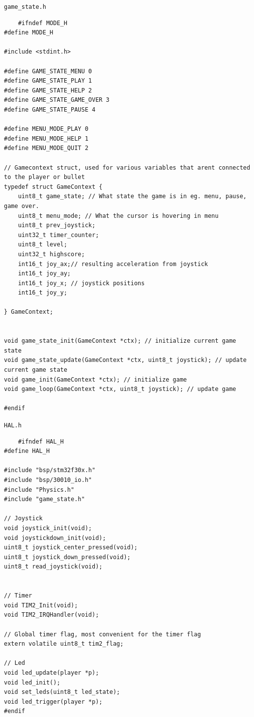 \texttt{game\_state.h}
\begin{lstlisting}
    #ifndef MODE_H
#define MODE_H

#include <stdint.h>

#define GAME_STATE_MENU 0
#define GAME_STATE_PLAY 1
#define GAME_STATE_HELP 2
#define GAME_STATE_GAME_OVER 3
#define GAME_STATE_PAUSE 4

#define MENU_MODE_PLAY 0
#define MENU_MODE_HELP 1
#define MENU_MODE_QUIT 2

// Gamecontext struct, used for various variables that arent connected to the player or bullet
typedef struct GameContext {
    uint8_t game_state; // What state the game is in eg. menu, pause, game over.
    uint8_t menu_mode; // What the cursor is hovering in menu
    uint8_t prev_joystick;
    uint32_t timer_counter;
    uint8_t level;
    uint32_t highscore;
    int16_t joy_ax;// resulting acceleration from joystick
    int16_t joy_ay;
    int16_t joy_x; // joystick positions
    int16_t joy_y;

} GameContext;


void game_state_init(GameContext *ctx); // initialize current game state
void game_state_update(GameContext *ctx, uint8_t joystick); // update current game state
void game_init(GameContext *ctx); // initialize game
void game_loop(GameContext *ctx, uint8_t joystick); // update game

#endif
\end{lstlisting}

\texttt{HAL.h}
\begin{lstlisting}
    #ifndef HAL_H
#define HAL_H

#include "bsp/stm32f30x.h"
#include "bsp/30010_io.h"
#include "Physics.h"
#include "game_state.h"

// Joystick
void joystick_init(void);
void joystickdown_init(void);
uint8_t joystick_center_pressed(void);
uint8_t joystick_down_pressed(void);
uint8_t read_joystick(void);


// Timer
void TIM2_Init(void);
void TIM2_IRQHandler(void);

// Global timer flag, most convenient for the timer flag
extern volatile uint8_t tim2_flag;

// Led
void led_update(player *p);
void led_init();
void set_leds(uint8_t led_state);
void led_trigger(player *p);
#endif
\end{lstlisting}

